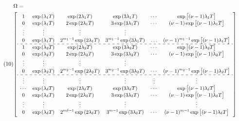 \documentclass[12pt,a4paper]{article}
\begin{document}
\begin{equation}\tag{10}\label{pt10}
\begin{aligned} & \Omega= \\ 
	& 
	{\small
	{\left[\begin{array}{cccccc}1 & \exp \left(\lambda_1 T\right) & \exp \left(2 \lambda_1 T\right) & \exp \left(3 \lambda_1 T\right) & \cdots & \exp \left[(\nu-1) \lambda_1 T\right] \\ 0 & \exp \left(\lambda_1 T\right) & 2 \exp \left(2 \lambda_1 T\right) & 3 \exp \left(3 \lambda_1 T\right) & \cdots & (\nu-1) \exp \left[(\nu-1) \lambda_1 T\right] \\ \vdots & \vdots & \vdots & \vdots & & \\ 0 & \exp \left(\lambda_1 T\right) & 2^{m_1-1} \exp \left(2 \lambda_1 T\right) & 3^{m_1-1} \exp \left(3 \lambda_1 T\right) & \ldots & (\nu-1)^{m_1-1} \exp \left[(\nu-1) \lambda_1 T\right] \\ \hdashline 1 & \exp \left(\lambda_2 T\right) & \exp \left(2 \lambda_2 T\right) & \exp \left(3 \lambda_2 T\right) & \cdots & \exp \left[(\nu-1) \lambda_2 T\right] \\ 0 & \exp \left(\lambda_2 T\right) & 2 \exp \left(2 \lambda_2 T\right) & 3 \exp \left(3 \lambda_2 T\right) & \cdots & (\nu-1) \exp \left[(\nu-1) \lambda_2 T\right] \\ \vdots & \vdots & \vdots & \vdots & & \\ 0 & \exp \left(\lambda_2 T\right) & 2^{m_2-1} \exp \left(2 \lambda_2 T\right) & 3^{m_2-1} \exp \left(3 \lambda_2 T\right) & \cdots & (\nu-1)^{m_2-1} \exp \left[(\nu-1) \lambda_2 T\right] \\ \hdashline \vdots & \vdots & \vdots & \vdots & \vdots & \vdots \\ \cdots & \exp \left(\lambda_\delta T\right) & \exp \left(2 \lambda_\delta T\right) & \exp \left(3 \lambda_\delta T\right) & \cdots & \exp \left[(\nu-1) \lambda_\delta T\right] \\ 0 & \exp \left(\lambda_\delta T\right) & 2 \exp \left(2 \lambda_\delta T\right) & 3 \exp \left(3 \lambda_\delta T\right) & \cdots & (\nu-1) \exp \left[(\nu-1) \lambda_\delta T\right] \\ \vdots & \vdots & \vdots & \vdots & & \vdots \\ 0 & \exp \left(\lambda_\delta T\right) & 2^{m \delta-1} \exp \left(2 \lambda_\delta T\right) & 3^{m-1} \exp \left(3 \lambda_\delta T\right) & \cdots & (\nu-1)^{m-1} \exp \left[(\nu-1) \lambda_\delta T\right]\end{array}
		\right]}} \\ & 
\end{aligned}
\end{equation}
\end{document}
